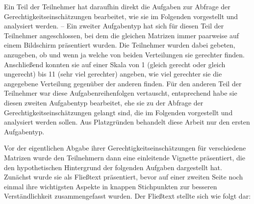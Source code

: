 \documentclass[a4paper]{thesis}
\begin{document}
Ein Teil der Teilnehmer hat daraufhin direkt die Aufgaben zur Abfrage der Gerechtigkeitseinschätzungen bearbeitet, wie sie im Folgenden vorgestellt und analysiert werden. – Ein zweiter Aufgabentyp hat sich für diesen Teil der Teilnehmer angeschlossen, bei dem die gleichen Matrizen immer paarweise auf einem Bildschirm präsentiert wurden. Die Teilnehmer wurden dabei gebeten, anzugeben, ob und wenn ja welche von beiden Verteilungen sie gerechter finden. Anschließend konnten sie auf einer Skala von 1 (gleich gerecht oder gleich ungerecht) bis 11 (sehr viel gerechter) angeben, wie viel gerechter sie die angegebene Verteilung gegenüber der anderen finden. Für den anderen Teil der Teilnehmer war diese Aufgabenreihenfolgen vertauscht, entsprechend habe sie diesen zweiten Aufgabentyp bearbeitet, ehe sie zu der Abfrage der Gerechtigkeitseinschätzungen gelangt sind, die im Folgenden vorgestellt und analysiert werden sollen. Aus Platzgründen behandelt diese Arbeit nur den ersten Aufgabentyp.

Vor der eigentlichen Abgabe ihrer Gerechtigkeitseinschätzungen für verschiedene Matrizen wurde den Teilnehmern dann eine einleitende Vignette präsentiert, die den hypothetischen Hintergrund der folgenden Aufgaben dargestellt hat. Zunächst wurde sie als Fließtext präsentiert, bevor auf einer zweiten Seite noch einmal ihre wichtigsten Aspekte in knappen Stichpunkten zur besseren Verständlichkeit zusammengefasst wurden. Der Fließtext stellte sich wie folgt dar:
\end{document}
